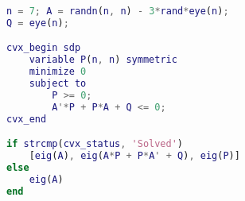 \begin{lstlisting}[language=Matlab]
n = 7; A = randn(n, n) - 3*rand*eye(n);
Q = eye(n);

cvx_begin sdp
    variable P(n, n) symmetric
    minimize 0
    subject to
        P >= 0;
        A'*P + P*A + Q <= 0;
cvx_end

if strcmp(cvx_status, 'Solved')
    [eig(A), eig(A*P + P*A' + Q), eig(P)]
else
    eig(A)
end
\end{lstlisting}